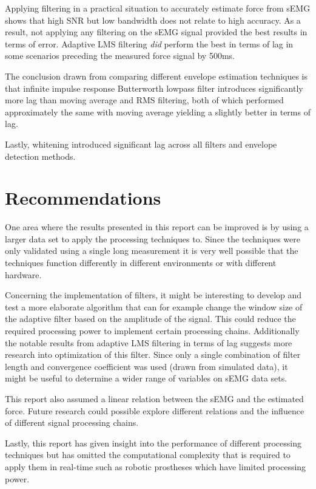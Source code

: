 Applying filtering in a practical situation to accurately estimate force from sEMG shows that high SNR but low bandwidth does not relate to high accuracy. As a result, not applying any filtering on the sEMG signal provided the best results in terms of error. Adaptive LMS filtering \textit{did} perform the best in terms of lag in some scenarios preceding the measured force signal by 500ms.

The conclusion drawn from comparing different envelope estimation techniques is that infinite impulse response Butterworth lowpass filter introduces significantly more lag than moving average and RMS filtering, both of which performed approximately the same with moving average yielding a slightly better in terms of lag.

Lastly, whitening introduced significant lag across all filters and envelope detection methods.

\section{Recommendations}
One area where the results presented in this report can be improved is by using a larger data set to apply the processing techniques to. Since the techniques were only validated using a single long measurement it is very well possible that the techniques function differently in different environments or with different hardware.

Concerning the implementation of filters, it might be interesting to develop and test a more elaborate algorithm that can for example change the window size of the adaptive filter based on the amplitude of the signal. This could reduce the required processing power to implement certain processing chains. Additionally the notable results from adaptive LMS filtering in terms of lag suggests more research into optimization of this filter. Since only a single combination of filter length and convergence coefficient was used (drawn from simulated data), it might be useful to determine a wider range of variables on sEMG data sets.

This report also assumed a linear relation between the sEMG and the estimated force. Future research could possible explore different relations and the influence of different signal processing chains.

Lastly, this report has given insight into the performance of different processing techniques but has omitted the computational complexity that is required to apply them in real-time such as robotic prostheses \cite{semg_application_prosthesis} which have limited processing power. 